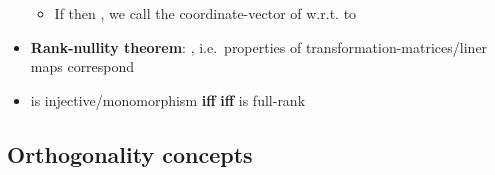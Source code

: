 \begin{itemize}
        \begin{itemize}

          \item
                If  then
                , we call  the
                coordinate-vector of  w.r.t. to 
        \end{itemize}
  \item
        \textbf{Rank-nullity theorem}:
        ,
        i.e.~properties of transformation-matrices/liner maps correspond
  \item
         is injective/monomorphism \textbf{iff}
         \textbf{iff}  is full-rank
\end{itemize}

\subsection*{Orthogonality concepts}

